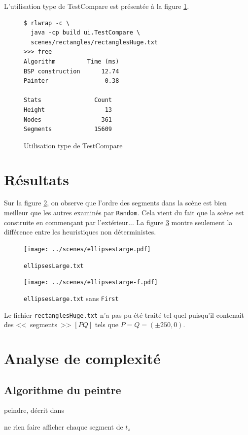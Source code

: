 \documentclass[12pt,twocolumn]{article}
\newcommand{\es}{\emptyset}
\begin{document}
L'utilisation type de TestCompare est présentée à la figure \ref{fig:cmp}.

\begin{figure}[h]
\begin{verbatim}
$ rlwrap -c \
  java -cp build ui.TestCompare \
  scenes/rectangles/rectanglesHuge.txt
>>> free
Algorithm         Time (ms)
BSP construction      12.74
Painter                0.38

Stats               Count
Height                 13
Nodes                 361
Segments            15609
\end{verbatim}
\caption{Utilisation type de TestCompare}\label{fig:cmp}
\end{figure}


\section{Résultats}
Sur la figure \ref{fig:eL}, on observe que l'ordre des segments dans la
scène est bien meilleur que les autres examinés par \texttt{Random}. Cela vient
du fait que la scène est construite en commençant par l'extérieur...
La figure \ref{fig:eL-n} montre seulement la différence entre
les heuristiques non déterministes.
\begin{figure}[p]
\center
\texttt{[image: ../scenes/ellipsesLarge.pdf]}
\caption{\texttt{ellipsesLarge.txt}}\label{fig:eL}
\end{figure}
\begin{figure}[p]
\center
\texttt{[image: ../scenes/ellipsesLarge-f.pdf]}
\caption{\texttt{ellipsesLarge.txt} sans \texttt{First}}\label{fig:eL-n}
\end{figure}

Le fichier \texttt{rectanglesHuge.txt} n'a pas pu été traité tel quel puisqu'il
contenait des <<~segments~>> $[PQ]$ tels que $P=Q=(\pm250,0)$.


\section{Analyse de complexité}
\subsection{Algorithme du peintre}
\begin{algorithm}
\caption{peindre, décrit dans \cite[p.~255]{cg}}
\SetAlgoLined\DontPrintSemicolon
\KwData{$t, \; pov$}
\uIf{$t=\es$} {
	ne rien faire
}
\uElseIf{$(t^+=\es) \land (t^-=\es)$} {
	afficher chaque segment de $t_s$
}
~
\end{algorithm}
\end{document}
